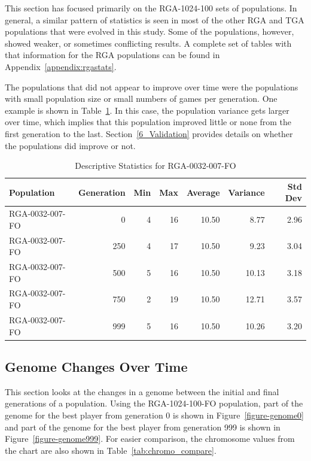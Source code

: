 This section has focused primarily on the RGA-1024-100 sets of populations. In
general, a similar pattern of statistics is seen in most of the other RGA and
TGA populations that were evolved in this study. Some of the populations,
however, showed weaker, or sometimes conflicting results. A complete set of
tables with that information for the RGA populations can be found in
Appendix~\ref{appendix:rgastats}.

The populations that did not appear to improve over time were the populations
with small population size or small numbers of games per generation. One example
is shown in Table~\ref{tab:6_RGA-0032-007-FO}. In this case, the population
variance gets larger over time, which implies that this population improved
little or none from the first generation to the last. Section~\ref{6_Validation}
provides details on whether the populations did improve or not.

\begin{table}[htbp]
  \centering
  \caption[RGA-0032-007-FO Statistics]{Descriptive Statistics for RGA-0032-007-FO}
    \begin{tabular}{lrrrrrr}
    \toprule
    Population &  Generation & Min    & Max    & Average & Variance & Std Dev \\
    \midrule
    RGA-0032-007-FO & 0      & 4      & 16     & 10.50  & 8.77   & 2.96 \\
    RGA-0032-007-FO & 250    & 4      & 17     & 10.50  & 9.23   & 3.04 \\
    RGA-0032-007-FO & 500    & 5      & 16     & 10.50  & 10.13  & 3.18 \\
    RGA-0032-007-FO & 750    & 2      & 19     & 10.50  & 12.71  & 3.57 \\
    RGA-0032-007-FO & 999    & 5      & 16     & 10.50  & 10.26  & 3.20 \\
    \bottomrule
    \end{tabular}
  \label{tab:6_RGA-0032-007-FO}%
\end{table}%

\subsection{Genome Changes Over Time} \label{6_genomeChanges}

This section looks at the changes in a genome between the initial and final
generations of a population. Using the RGA-1024-100-FO population, part of
the genome for the best player from generation 0 is shown in
Figure~\ref{figure-genome0} and part of the genome for the best player from
generation 999 is shown in Figure~\ref{figure-genome999}. For easier comparison,
the chromosome values from the chart are also shown in
Table~\ref{tab:chromo_compare}.

